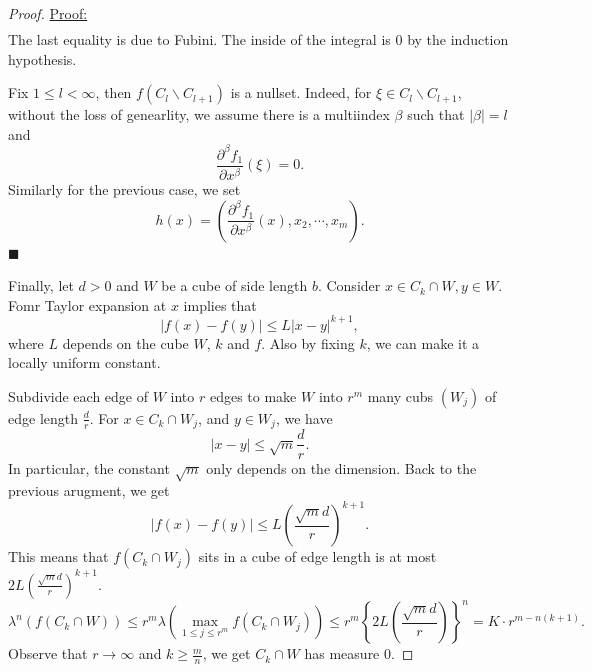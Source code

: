 \documentclass[8pt]{article}
\newenvironment{claimproof}[1]{\par\noindent\underline{Proof:}\space#1}{\hfill $\blacksquare$}
\begin{document}
\begin{proof}
\begin{claimproof}
\begin{align*}
   \end{align*} 
   The last equality is due to Fubini. The inside of the integral is $0$ by the induction hypothesis.
   \par Fix $1\leq l<\infty$, then $f(C_l\backslash C_{l+1})$ is a nullset. Indeed, for $\xi\in C_l\backslash C_{l+1}$, without the loss of genearlity, we assume there is a multiindex $\beta$ such that $\vert\beta\vert = l$ and 
   \begin{equation*}
    {\frac{\partial^\beta f_1}{\partial x^\beta}}(\xi) = 0.
   \end{equation*}
   Similarly for the previous case, we set 
   \begin{equation*}
    h(x) = \left({\frac{\partial^\beta f_1}{\partial x^\beta}}(x),x_2,\cdots,x_m\right).
   \end{equation*}
  \end{claimproof}
   \par Finally, let $d>0$ and $W$ be a cube of side length $b$. Consider $x\in C_k\cap W, y\in W$. Fomr Taylor expansion at $x$ implies that 
   \begin{equation*}
    \vert f(x)-f(y)\vert \leq L\vert x-y\vert^{k+1},
   \end{equation*}
   where $L$ depends on the cube $W$, $k$ and $f$. Also by fixing $k$, we can make it a locally uniform constant.
   \par Subdivide each edge of $W$ into $r$ edges to make $W$ into $r^m$ many cubs $(W_j)$ of edge length ${\frac d r}$. For $x\in C_k\cap W_j$, and $y\in W_j$, we have 
   \begin{equation*}
    \vert x-y\vert \leq \sqrt{m}{\frac d r}.
   \end{equation*}
   In particular, the constant $\sqrt{m}$ only depends on the dimension. Back to the previous arugment, we get 
   \begin{equation*}
    \vert f(x)-f(y)\vert \leq L\left({\frac {\sqrt{m}d} r}\right)^{k+1}.
   \end{equation*}
   This means that $f(C_k\cap W_j)$ sits in a cube of edge length is at most $2L\left({\frac {\sqrt{m}d} r}\right)^{k+1}$.
   \begin{equation*}
    \lambda^n(f(C_k\cap W))\leq r^m\lambda(\max_{1\leq j\leq r^m}f(C_k\cap W_j)) \leq r^m \left\{2L\left({\frac {\sqrt{m}d} r}\right)\right\}^n = K\cdot r^{m-n(k+1)}.
   \end{equation*}
   Observe that $r\to\infty$ and $k\geq {\frac m n}$, we get $C_k\cap W$ has measure $0$.
\end{proof}
\end{document}
